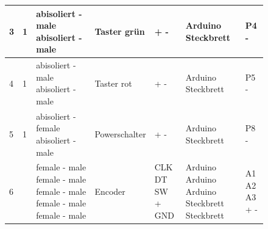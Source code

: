 \begin{figure}[H]
\begin{center}
\begin{tabularx}{\textwidth}{|p{0.5cm}|p{1cm}|p{2.5cm}|p{2cm}|p{2cm}|p{2cm}|p{2cm}|}
			3 & 1 & \newline abisoliert - male \newline abisoliert - male  & Taster grün & \newline + \newline - & \newline Arduino \newline Steckbrett & \newline P4 \newline -  \\ \hline
			4 & 1 & \newline abisoliert - male \newline abisoliert - male  & Taster rot & \newline + \newline - & \newline Arduino \newline Steckbrett & \newline P5 \newline -  \\ \hline
			5 & 1 & \newline abisoliert - female \newline abisoliert - male  & Powerschalter & \newline + \newline - & \newline Arduino \newline Steckbrett & \newline P8 \newline - \\ \hline
			6 & \newline 3  & \newline female - male \newline female - male \newline female - male \newline female - male \newline female - male & Encoder & \newline CLK \newline DT \newline SW \newline + \newline GND  &\newline Arduino \newline Arduino \newline Arduino \newline Steckbrett \newline Steckbrett &\newline A1 \newline A2 \newline A3 \newline + \newline - \\ \hline

\end{tabularx}
\end{center}
\end{figure}
